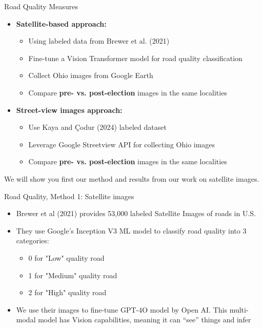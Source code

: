 \documentclass{beamer}
\begin{document}
\begin{frame}{Road Quality Measures}
    \begin{itemize}
        \item \textbf{Satellite-based approach:}
            \begin{itemize}
                \item Using labeled data from Brewer et al. (2021)
                \item Fine-tune a Vision Transformer model for road quality classification
                \item Collect Ohio images from Google Earth
                \item Compare \textbf{pre- vs. post-election} images in the same localities
            \end{itemize}
        \vskip 0.5cm
        \item \textbf{Street-view images approach:}
            \begin{itemize}
                \item Use Kaya and Çodur (2024) labeled dataset
                \item Leverage Google Streetview API for collecting Ohio images
                \item Compare \textbf{pre- vs. post-election} images in the same localities
            \end{itemize}
    \end{itemize}
    We will show you first our method and results from our work on satellite images.
\end{frame}

\begin{frame}{Road Quality, Method 1: Satellite images}
    \begin{itemize}
        \item Brewer et al (2021) provides 53,000 labeled Satellite Images of roads in U.S.
        \item They use Google’s Inception V3 ML model to classify road quality into 3 categories:
            \begin{itemize}
                \item 0 for "Low" quality road
                \item 1 for "Medium" quality road
                \item 2 for "High" quality road
            \end{itemize}
        \item We use their images to fine-tune GPT-4O model by Open AI. This multi-modal model has Vision capabilities, meaning it can “see” things and infer
    \end{itemize}
\end{frame}
\end{document}
